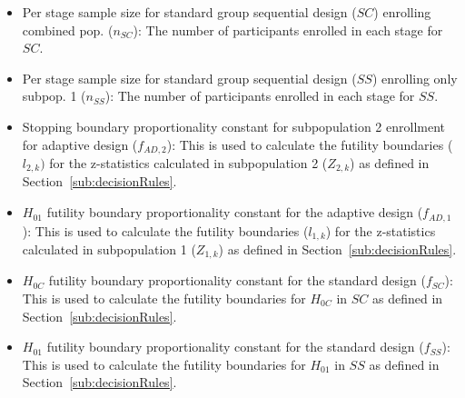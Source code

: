 \documentclass[article]{jss}
\begin{document}
\begin{itemize}

\item Per stage sample size for standard group sequential design ($SC$) enrolling combined pop. ($n_{SC}$): The number of participants enrolled in each stage for $SC$.

\item Per stage sample size for standard group sequential design ($SS$) enrolling only subpop. 1 ($n_{SS}$): The number of participants enrolled in each stage for $SS$.

\item Stopping boundary proportionality constant for subpopulation 2 enrollment for adaptive design ($f_{AD,2}$): This is used to calculate the futility boundaries ($l_{2,k})$ for the z-statistics calculated in subpopulation 2 ($Z_{2,k}$) as defined in Section~\ref{sub:decisionRules}.

\item $H_{01}$ futility boundary proportionality constant for the adaptive design ($f_{AD,1}$):  This is used to calculate the futility boundaries ($l_{1,k}$) for the z-statistics calculated in subpopulation 1 ($Z_{1,k}$) as defined in Section~\ref{sub:decisionRules}.

\item $H_{0C}$ futility boundary proportionality constant for the standard design ($f_{SC}$): This is used to calculate the futility boundaries for $H_{0C}$ in $SC$ as defined in Section~\ref{sub:decisionRules}. %

\item $H_{01}$ futility boundary proportionality constant for the standard design ($f_{SS}$):  This is used to calculate the futility boundaries for $H_{01}$ in $SS$ as defined in Section~\ref{sub:decisionRules}. %



\end{itemize}
\end{document}
